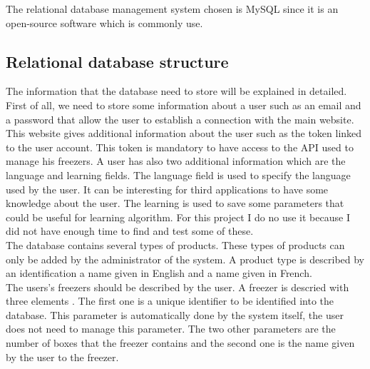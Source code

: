 The relational database management system chosen is MySQL since it is an open-source software which is commonly use.
\subsection{Relational database structure}
The information that the database need to store will be explained in detailed.\\

First of all, we need to store some information about a user such as an email and a password that allow the user to establish a connection with the main website. This website gives additional information about the user such as the token linked to the user account. This token is mandatory to have access to the API used to manage his freezers. A user has also two additional information which are the language and learning fields. The language field is used to specify the language used by the user. It can be interesting for third applications to have some knowledge about the user. The learning is used to save some parameters that could be useful for learning algorithm. For this project I do no use it because I did not have enough time to find and test some of these. \\

The database contains several types of products. These types of products can only be added by the administrator of the system. A product type is described by an identification a name given in English and a name given in French. \\

The users's freezers should be described by the user. A freezer is descried with three elements . The first one is a unique identifier to be identified into the database. This parameter is automatically done by the system itself, the user does not need to manage this parameter. The two other parameters are the number of boxes that the freezer contains and the second one is the name given by the user to the freezer. \\

